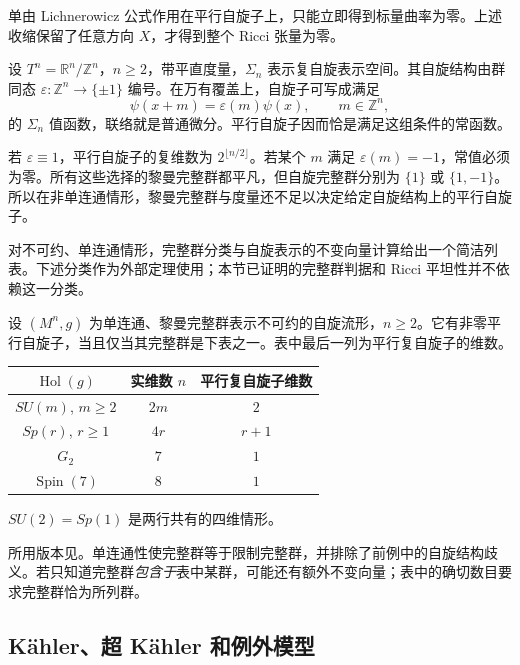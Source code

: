单由 Lichnerowicz 公式作用在平行自旋子上，只能立即得到标量曲率为零。上述收缩保留了任意方向 \(X\)，才得到整个 Ricci 张量为零。

\begin{example}\label{g3:exm:B-torus-spin-structures}
 设 \(T^n=\mathbb R^n/\mathbb Z^n\)，\(n\ge2\)，带平直度量，\(\Sigma_n\) 表示复自旋表示空间。其自旋结构由群同态 \(\varepsilon:\mathbb Z^n\to\{\pm1\}\) 编号。在万有覆盖上，自旋子可写成满足
 \[
  \psi(x+m)=\varepsilon(m)\psi(x),\qquad m\in\mathbb Z^n,
 \]
 的 \(\Sigma_n\) 值函数，联络就是普通微分。平行自旋子因而恰是满足这组条件的常函数。

 若 \(\varepsilon\equiv1\)，平行自旋子的复维数为 \(2^{\lfloor n/2\rfloor}\)。若某个 \(m\) 满足 \(\varepsilon(m)=-1\)，常值必须为零。所有这些选择的黎曼完整群都平凡，但自旋完整群分别为 \(\{1\}\) 或 \(\{1,-1\}\)。所以在非单连通情形，黎曼完整群与度量还不足以决定给定自旋结构上的平行自旋子。
\end{example}

对不可约、单连通情形，完整群分类与自旋表示的不变向量计算给出一个简洁列表。下述分类作为外部定理使用；本节已证明的完整群判据和 Ricci 平坦性并不依赖这一分类。

\begin{theorem}[不可约情形的平行自旋子分类]\label{g3:thm:B-parallel-spinor-classification}
 设 \((M^n,g)\) 为单连通、黎曼完整群表示不可约的自旋流形，\(n\ge2\)。它有非零平行自旋子，当且仅当其完整群是下表之一。表中最后一列为平行复自旋子的维数。
 \begin{center}
 \begin{tabular}{c c c}
  \(\operatorname{Hol}(g)\)&实维数 \(n\)&平行复自旋子维数\\
  \hline
  \(SU(m)\), \(m\ge2\)&\(2m\)&\(2\)\\
  \(Sp(r)\), \(r\ge1\)&\(4r\)&\(r+1\)\\
  \(G_2\)&\(7\)&\(1\)\\
  \(\operatorname{Spin}(7)\)&\(8\)&\(1\)
 \end{tabular}
 \end{center}
 \(SU(2)=Sp(1)\) 是两行共有的四维情形。
\end{theorem}

所用版本见\cite[作者版本第3页定理2、第4页表1]{MoroianuSemmelmann2000ParallelSpinors}。单连通性使完整群等于限制完整群，并排除了前例中的自旋结构歧义。若只知道完整群\emph{包含于}表中某群，可能还有额外不变向量；表中的确切数目要求完整群恰为所列群。

\subsection{Kähler、超 Kähler 和例外模型}
\label{g3:subsec:B03:03}

